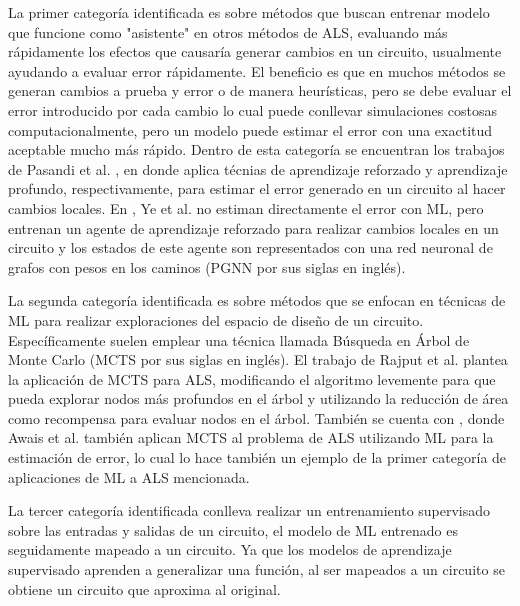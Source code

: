 La primer categoría identificada es sobre métodos que buscan entrenar modelo
que funcione como "asistente" en otros métodos de ALS, evaluando más
rápidamente los efectos que causaría generar cambios en un circuito, usualmente
ayudando a evaluar error rápidamente. El beneficio es que en muchos métodos se
generan cambios a prueba y error o de manera heurísticas, pero se debe evaluar
el error introducido por cada cambio lo cual puede conllevar simulaciones
costosas computacionalmente, pero un modelo puede estimar el error con una
exactitud aceptable mucho más rápido. Dentro de esta categoría se encuentran
los trabajos de Pasandi et al. \cite{pasandi_approximate_2019}
\cite{pasandi_deep-powerx_2020}, en donde aplica técnias de aprendizaje
reforzado y aprendizaje profundo, respectivamente, para estimar el error
generado en un circuito al hacer cambios locales. En
\cite{ye_timing-driven_2024}, Ye et al. no estiman directamente el error con
ML, pero entrenan un agente de aprendizaje reforzado para realizar cambios
locales en un circuito y los estados de este agente son representados con una
red neuronal de grafos con pesos en los caminos (PGNN por sus siglas en
inglés).

La segunda categoría identificada es sobre métodos que se enfocan en técnicas
de ML para realizar exploraciones del espacio de diseño de un circuito.
Específicamente suelen emplear una técnica llamada Búsqueda en Árbol de Monte
Carlo (MCTS por sus siglas en inglés). El trabajo de Rajput et al.
\cite{rajput_improved_2023} plantea la aplicación de MCTS para ALS, modificando
el algoritmo levemente para que pueda explorar nodos más profundos en el árbol
y utilizando la reducción de área como recompensa para evaluar nodos en el
árbol. También se cuenta con \cite{awais_deepapprox_2024}, donde Awais et al.
también aplican MCTS al problema de ALS utilizando ML para la estimación de
error, lo cual lo hace también un ejemplo de la primer categoría de
aplicaciones de ML a ALS mencionada.

La tercer categoría identificada conlleva realizar un entrenamiento supervisado
sobre las entradas y salidas de un circuito, el modelo de ML entrenado es
seguidamente mapeado a un circuito. Ya que los modelos de aprendizaje
supervisado aprenden a generalizar una función, al ser mapeados a un circuito
se obtiene un circuito que aproxima al original.

